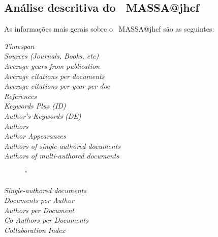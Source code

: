\subsection{Análise descritiva do \dataset\   MASSA@jhcf}


As informações mais gerais sobre o \dataset\   MASSA@jhcf são as seguintes:
\begin{description}
    \item [\textit{Timespan}] 
    \item [\textit{Sources (Journals, Books, etc)}] 
    \item [\textit{Average years from publication}] 
    \item [\textit{Average citations per documents}] 
    \item [\textit{Average citations per year per doc}] 
    \item [\textit{References}] 
    \item [\textit{Keywords Plus (ID)}] 
    \item [\textit{Author's Keywords (DE)}] 
    \item [\textit{Authors}]  
    \item [\textit{Author Appearances}] 
    \item [\textit{Authors of single-authored documents}] 
    \item [\textit{Authors of multi-authored documents}] "
    \item [\textit{Single-authored documents}] 
    \item [\textit{Documents per Author}] 
    \item [\textit{Authors per Document}] 
    \item [\textit{Co-Authors per Documents}] 
    \item [\textit{Collaboration Index}] 
\end{description}
